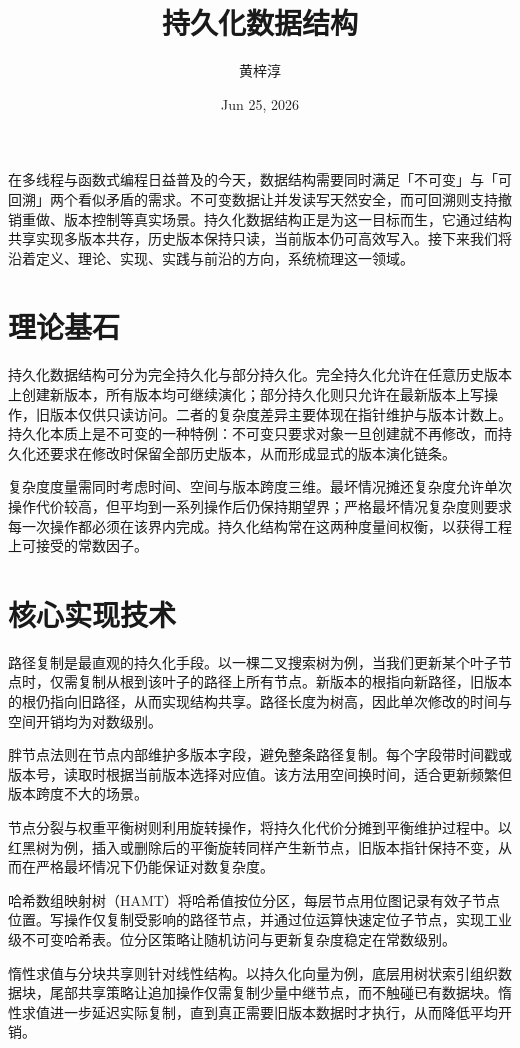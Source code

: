 \title{持久化数据结构}
\author{黄梓淳}
\date{Jun 25, 2026}
\maketitle
在多线程与函数式编程日益普及的今天，数据结构需要同时满足「不可变」与「可回溯」两个看似矛盾的需求。不可变数据让并发读写天然安全，而可回溯则支持撤销重做、版本控制等真实场景。持久化数据结构正是为这一目标而生，它通过结构共享实现多版本共存，历史版本保持只读，当前版本仍可高效写入。接下来我们将沿着定义、理论、实现、实践与前沿的方向，系统梳理这一领域。\par
\chapter{理论基石}
持久化数据结构可分为完全持久化与部分持久化。完全持久化允许在任意历史版本上创建新版本，所有版本均可继续演化；部分持久化则只允许在最新版本上写操作，旧版本仅供只读访问。二者的复杂度差异主要体现在指针维护与版本计数上。持久化本质上是不可变的一种特例：不可变只要求对象一旦创建就不再修改，而持久化还要求在修改时保留全部历史版本，从而形成显式的版本演化链条。\par
复杂度度量需同时考虑时间、空间与版本跨度三维。最坏情况摊还复杂度允许单次操作代价较高，但平均到一系列操作后仍保持期望界；严格最坏情况复杂度则要求每一次操作都必须在该界内完成。持久化结构常在这两种度量间权衡，以获得工程上可接受的常数因子。\par
\chapter{核心实现技术}
路径复制是最直观的持久化手段。以一棵二叉搜索树为例，当我们更新某个叶子节点时，仅需复制从根到该叶子的路径上所有节点。新版本的根指向新路径，旧版本的根仍指向旧路径，从而实现结构共享。路径长度为树高，因此单次修改的时间与空间开销均为对数级别。\par
胖节点法则在节点内部维护多版本字段，避免整条路径复制。每个字段带时间戳或版本号，读取时根据当前版本选择对应值。该方法用空间换时间，适合更新频繁但版本跨度不大的场景。\par
节点分裂与权重平衡树则利用旋转操作，将持久化代价分摊到平衡维护过程中。以红黑树为例，插入或删除后的平衡旋转同样产生新节点，旧版本指针保持不变，从而在严格最坏情况下仍能保证对数复杂度。\par
哈希数组映射树（HAMT）将哈希值按位分区，每层节点用位图记录有效子节点位置。写操作仅复制受影响的路径节点，并通过位运算快速定位子节点，实现工业级不可变哈希表。位分区策略让随机访问与更新复杂度稳定在常数级别。\par
惰性求值与分块共享则针对线性结构。以持久化向量为例，底层用树状索引组织数据块，尾部共享策略让追加操作仅需复制少量中继节点，而不触碰已有数据块。惰性求值进一步延迟实际复制，直到真正需要旧版本数据时才执行，从而降低平均开销。\par
